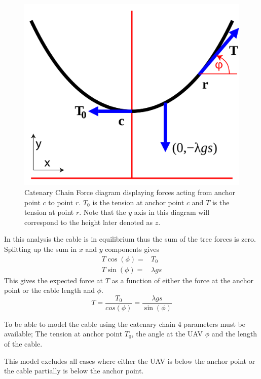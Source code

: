 \begin{figure}[H]
\centering
\includegraphics[scale=0.25]{graphics/CatenaryForceDiagram.png}
\caption{Catenary Chain Force diagram displaying forces acting from anchor point $c$ to point $r$. $T_0$ is the tension at anchor point $c$ and $T$ is the tension at point $r$. Note that the $y$ axis in this diagram will correspond to the height later denoted as $z$.}
\label{fig:catenary_force_diagram}
\end{figure}

\noindent
In this analysis the cable is in equilibrium thus the sum of the tree forces is zero. Splitting up the sum in $x$ and $y$ components gives
\begin{eqnarray}
T\cos(\phi) =& T_0 \\
T \sin(\phi) =& \lambda g s
\end{eqnarray}
This gives the expected force at $T$ as a function of either the force at the anchor point or the cable length and $\phi$.
\begin{equation}
T = \frac{T_0}{cos(\phi)} = \frac{\lambda g s}{\sin(\phi)}
\end{equation}

To be able to model the cable using the catenary chain 4 parameters must be available; The tension at anchor point $T_0$, the angle at the UAV $\phi$ and the length of the cable.

\noindent
This model excludes all cases where either the UAV is below the anchor point or the cable partially is below the anchor point.



